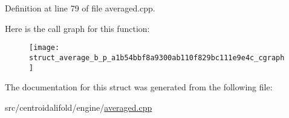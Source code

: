 Definition at line 79 of file averaged.\+cpp.



Here is the call graph for this function\+:
\nopagebreak
\begin{figure}[H]
\begin{center}
\leavevmode
\texttt{[image: struct\_average\_b\_p\_a1b54bbf8a9300ab110f829bc111e9e4c\_cgraph]}
\end{center}
\end{figure}




The documentation for this struct was generated from the following file\+:\begin{DoxyCompactItemize}
\item 
src/centroidalifold/engine/\hyperlink{averaged_8cpp}{averaged.\+cpp}\end{DoxyCompactItemize}
